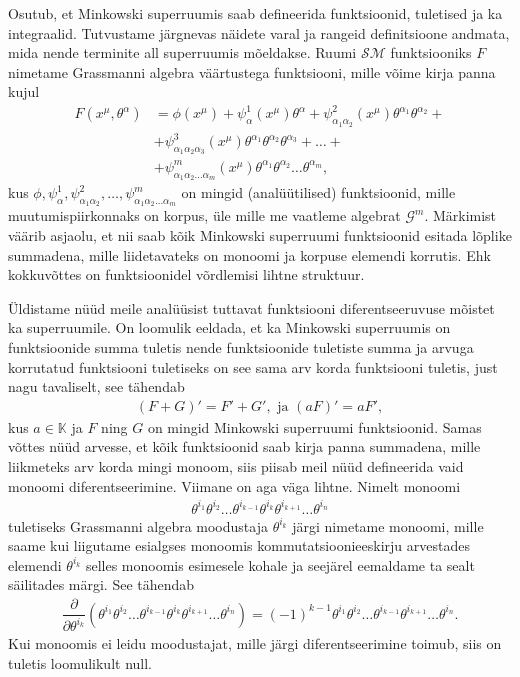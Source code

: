 \documentclass[12pt]{article}
\theoremstyle{plain}
\theoremstyle{definition}
\numberwithin{equation}{section}
\def\K{{\mathbb K}}
\def\G{{\mathcal G}}
\def\SM{{\mathcal {SM}}}
\begin{document}
Osutub, et Minkowski superruumis saab defineerida 
funktsioonid, tuletised ja ka integraalid. Tutvustame 
järgnevas näidete varal ja rangeid definitsioone andmata, 
mida nende terminite all superruumis mõeldakse. Ruumi $\SM$ 
funktsiooniks $F$ nimetame Grassmanni algebra väärtustega 
funktsiooni, mille võime kirja panna kujul
\begin{align*}
F \left(x^{\mu}, \theta^{\alpha} \right) &= 
\phi \left(x^{\mu}\right) + 
\psi_{\alpha}^{1} \left(x^{\mu}\right) \theta^{\alpha} + 
\psi_{\alpha_1 \alpha_2}^{2} \left(x^{\mu}\right) 
	\theta^{\alpha_1} \theta^{\alpha_2} + \\
&+ \psi_{\alpha_1 \alpha_2 \alpha_3}^{3} \left(x^{\mu}\right) 
	\theta^{\alpha_1} \theta^{\alpha_2} \theta^{\alpha_3} + 
\ldots + \\
&+ \psi_{\alpha_1 \alpha_2 \ldots \alpha_m}^{m} 
	\left(x^{\mu}\right) \theta^{\alpha_1} \theta^{\alpha_2} 
	\ldots \theta^{\alpha_m}, 
\end{align*}
kus $\phi, \psi_{\alpha}^{1}, \psi_{\alpha_1 \alpha_2}^{2}, 
\ldots, \psi_{\alpha_1 \alpha_2 \ldots \alpha_m}^{m}$ on mingid 
(analüütilised) funktsioonid, mille muutumispiirkonnaks on 
korpus, üle mille me vaatleme algebrat $\G^m$. Märkimist väärib 
asjaolu, et nii saab kõik Minkowski superruumi 
funktsioonid esitada lõplike summadena, mille liidetavateks on 
monoomi ja korpuse elemendi korrutis. Ehk kokkuvõttes on 
funktsioonidel võrdlemisi lihtne struktuur. 

Üldistame nüüd meile analüüsist tuttavat funktsiooni 
diferentseeruvuse mõistet ka superruumile. On loomulik eeldada, 
et ka Minkowski superruumis on funktsioonide summa tuletis 
nende funktsioonide tuletiste summa ja arvuga korrutatud funktsiooni 
tuletiseks on see sama arv korda funktsiooni tuletis, just nagu 
tavaliselt, see tähendab
\begin{align*}
\left(F + G\right)' = F' + G', \text{ ja } \left(aF\right)' = aF',
\end{align*}
kus $a \in \K$ ja $F$ ning $G$ on mingid Minkowski superruumi 
funktsioonid. Samas võttes nüüd arvesse, et kõik funktsioonid 
saab kirja panna summadena, mille liikmeteks arv korda mingi 
monoom, siis piisab meil nüüd defineerida vaid monoomi 
diferentseerimine. Viimane on aga väga lihtne. Nimelt 
monoomi 
\begin{align*}
\theta^{i_1} \theta^{i_2} \ldots \theta^{i_{k-1}} 
\theta^{i_k} \theta^{i_{k+1}} \ldots \theta^{i_n}
\end{align*}
tuletiseks Grassmanni algebra moodustaja $\theta^{i_k}$ järgi 
nimetame monoomi, mille saame kui liigutame esialgses monoomis
kommutatsioonieeskirju arvestades elemendi $\theta^{i_k}$ selles 
monoomis esimesele kohale ja seejärel eemaldame ta sealt 
säilitades märgi. See tähendab
\begin{align*}
\dfrac{\partial}{\partial \theta^{i_k}} \left(
\theta^{i_1} \theta^{i_2} \ldots \theta^{i_{k-1}} 
\theta^{i_k} \theta^{i_{k+1}} \ldots \theta^{i_n}
\right) = 
\left(-1\right)^{k-1} \theta^{i_1} \theta^{i_2} \ldots 
\theta^{i_{k-1}} \theta^{i_{k+1}} \ldots \theta^{i_n}.
\end{align*}
Kui monoomis ei leidu moodustajat, mille järgi 
diferentseerimine toimub, siis on tuletis loomulikult null.
\end{document}
